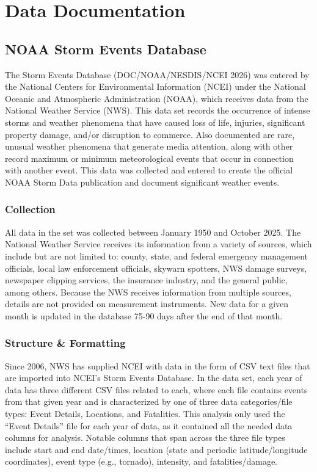 \documentclass[
  letterpaper,
  DIV=11,
  numbers=noendperiod]{scrreprt}
\begin{document}
\chapter{Data Documentation}\label{sec-data-doc}

\section{NOAA Storm Events Database}\label{noaa-storm-events-database}

The Storm Events Database (DOC/NOAA/NESDIS/NCEI 2026) was entered by the
National Centers for Environmental Information (NCEI) under the National
Oceanic and Atmospheric Administration (NOAA), which receives data from
the National Weather Service (NWS). This data set records the occurrence
of intense storms and weather phenomena that have caused loss of life,
injuries, significant property damage, and/or disruption to commerce.
Also documented are rare, unusual weather phenomena that generate media
attention, along with other record maximum or minimum meteorological
events that occur in connection with another event. This data was
collected and entered to create the official NOAA Storm Data publication
and document significant weather events.

\subsection{Collection}\label{collection}

All data in the set was collected between January 1950 and October 2025.
The National Weather Service receives its information from a variety of
sources, which include but are not limited to: county, state, and
federal emergency management officials, local law enforcement officials,
skywarn spotters, NWS damage surveys, newspaper clipping services, the
insurance industry, and the general public, among others. Because the
NWS receives information from multiple sources, details are not provided
on measurement instruments. New data for a given month is updated in the
database 75-90 days after the end of that month.

\subsection{Structure \& Formatting}\label{structure-formatting}

Since 2006, NWS has supplied NCEI with data in the form of CSV text
files that are imported into NCEI's Storm Events Database. In the data
set, each year of data has three different CSV files related to each,
where each file contains events from that given year and is
characterized by one of three data categories/file types: Event Details,
Locations, and Fatalities. This analysis only used the ``Event Details''
file for each year of data, as it contained all the needed data columns
for analysis. Notable columns that span across the three file types
include start and end date/times, location (state and periodic
latitude/longitude coordinates), event type (e.g., tornado), intensity,
and fatalities/damage.
\end{document}
